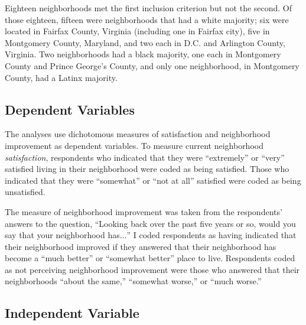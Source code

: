 \documentclass{baderart}
\begin{document}
Eighteen neighborhoods met the first inclusion criterion but not the second. Of those eighteen, fifteen were neighborhoods that had a white majority; six were located in Fairfax County, Virginia (including one in Fairfax city), five in Montgomery County, Maryland, and two each in D.C. and Arlington County, Virginia. Two neighborhoods had a black majority, one each in Montgomery County and Prince George's County, and only one neighborhood, in Montgomery County, had a Latinx majority.


\subsection{Dependent Variables}\label{dependent-variables}

The analyses use dichotomous measures of satisfaction and neighborhood improvement as dependent variables. To measure current neighborhood \emph{satisfaction}, respondents who indicated that they were ``extremely'' or ``very'' satisfied living in their neighborhood were coded as being satisfied. Those who indicated that they were ``somewhat'' or ``not at all'' satisfied were coded as being unsatisfied.

The measure of neighborhood improvement was taken from the respondents' answers to the question, ``Looking back over the past five years or so, would you say that your neighborhood has\(\ldots\)'' I coded respondents as having indicated that their neighborhood improved if they answered that their neighborhood has become a ``much better'' or ``somewhat better'' place to live. Respondents coded as not perceiving neighborhood improvement were those who answered that their neighborhoods ``about the same,'' ``somewhat worse,'' or ``much worse.''

\subsection{Independent Variable}\label{independent-variable}
\end{document}
